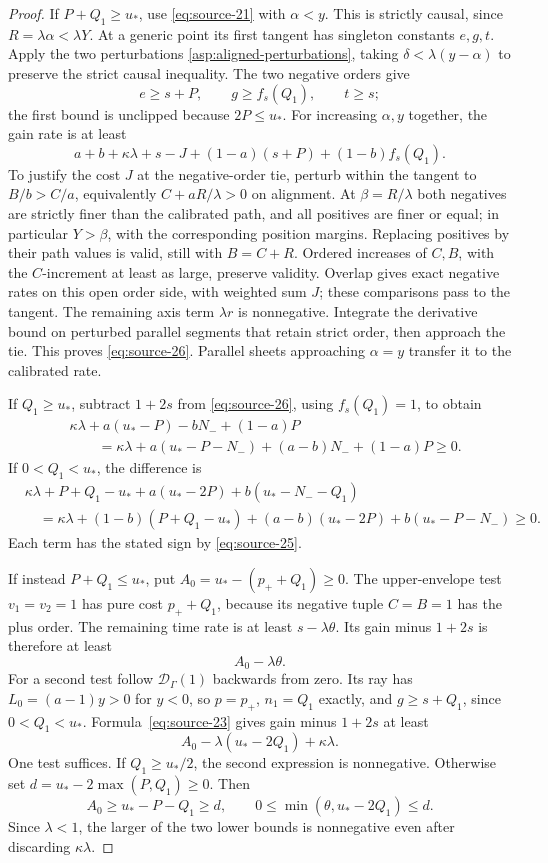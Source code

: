\begin{proof}
If \(P+Q_1\ge u_*\), use \eqref{eq:source-21} with
\(\alpha<y\). This is strictly causal, since
\(R=\lambda\alpha<\lambda Y\). At a generic point its first
tangent has singleton constants \(e,g,t\). Apply the two perturbations
\eqref{asp:aligned-perturbations}, taking \(\delta<\lambda(y-\alpha)\)
to preserve the strict causal inequality. The two negative orders give
\[
e\ge s+P,\qquad g\ge f_s(Q_1),\qquad t\ge s;
\]
the first bound is unclipped because \(2P\le u_*\).
For increasing \(\alpha,y\) together, the gain rate is at least
\begin{equation}\label{eq:source-26}
a+b+\kappa\lambda+s-J
 +(1-a)(s+P)+(1-b)f_s(Q_1).
\end{equation}
To justify the cost \(J\) at the negative-order tie, perturb within
the tangent to \(B/b>C/a\), equivalently \(C+aR/\lambda>0\)
on alignment. At \(\beta=R/\lambda\) both negatives are
strictly finer than the calibrated path, and all positives are finer
or equal; in particular \(Y>\beta\), with the corresponding
position margins. Replacing positives by their path values is valid,
still with \(B=C+R\). Ordered increases of \(C,B\), with the
\(C\)-increment at least as large, preserve validity. Overlap gives
exact negative rates on this open order side, with weighted sum
\(J\); these comparisons pass to the tangent. The remaining axis
term \(\lambda r\) is nonnegative. Integrate the derivative bound
on perturbed parallel segments that retain strict order, then approach
the tie. This proves \eqref{eq:source-26}. Parallel sheets approaching
\(\alpha=y\) transfer it to the calibrated rate.

If \(Q_1\ge u_*\), subtract \(1+2s\) from
\eqref{eq:source-26}, using \(f_s(Q_1)=1\), to obtain
\[
\begin{split}
&\kappa\lambda+a(u_*-P)-bN_-+(1-a)P\\
&\qquad=\kappa\lambda+a(u_*-P-N_-)+(a-b)N_-+(1-a)P\ge0.
\end{split}
\]
If \(0<Q_1<u_*\), the difference is
\[
\begin{split}
&\kappa\lambda+P+Q_1-u_*+a(u_*-2P)+b(u_*-N_--Q_1)\\
&\quad=\kappa\lambda+(1-b)(P+Q_1-u_*)
 +(a-b)(u_*-2P)+b(u_*-P-N_-)\ge0.
\end{split}
\]
Each term has the stated sign by \eqref{eq:source-25}.

If instead \(P+Q_1\le u_*\), put
\(A_0=u_*-(p_++Q_1)\ge0\). The upper-envelope test
\(v_1=v_2=1\) has pure cost \(p_++Q_1\), because its
negative tuple \(C=B=1\) has the plus order. The remaining
time rate is at least \(s-\lambda\theta\). Its gain minus
\(1+2s\) is therefore at least
\[
A_0-\lambda\theta.
\]
For a second test follow \(\mathcal D_\Gamma(1)\) backwards
from zero. Its ray has \(L_0=(a-1)y>0\) for \(y<0\),
so \(p=p_+\), \(n_1=Q_1\) exactly, and
\(g\ge s+Q_1\), since \(0<Q_1<u_*\).
Formula~\eqref{eq:source-23} gives gain minus \(1+2s\)
at least
\[
A_0-\lambda(u_*-2Q_1)+\kappa\lambda.
\]
One test suffices. If \(Q_1\ge u_*/2\), the second expression
is nonnegative. Otherwise set \(d=u_*-2\max(P,Q_1)\ge0\).
Then
\[
A_0\ge u_*-P-Q_1\ge d,\qquad
0\le\min(\theta,u_*-2Q_1)\le d.
\]
Since \(\lambda<1\), the larger of the two lower bounds is
nonnegative even after discarding \(\kappa\lambda\).


\end{proof}
